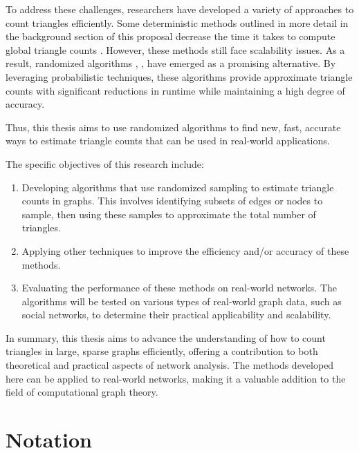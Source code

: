 \documentclass[11pt]{article}
\begin{document}
To address these challenges, researchers have developed a variety of approaches to count triangles efficiently.
Some deterministic methods outlined in more detail in the background section of this proposal decrease the time it takes to compute global triangle counts \cite{strassen_gaussian_1969}.
However, these methods still face scalability issues.
As a result, randomized algorithms \cite{tsourakakis_doulion_2009}, \cite{seshadhri_triadic_2013}, \cite{tsourakakis_fast_2008} have emerged as a promising alternative.
By leveraging probabilistic techniques, these algorithms provide approximate triangle counts with significant reductions in runtime while maintaining a high degree of accuracy.

Thus, this thesis aims to use randomized algorithms to find new, fast, accurate ways to estimate triangle counts that can be used in real-world applications.

The specific objectives of this research include:

\begin{enumerate}
    \item Developing algorithms that use randomized sampling to estimate triangle counts in graphs.
    This involves identifying subsets of edges or nodes to sample, then using these samples to approximate the total number of triangles.
    \item Applying other techniques to improve the efficiency and/or accuracy of these methods.
    \item Evaluating the performance of these methods on real-world networks.
    The algorithms will be tested on various types of real-world graph data, such as social networks, to determine their practical applicability and scalability.
\end{enumerate}

In summary, this thesis aims to advance the understanding of how to count triangles in large, sparse graphs efficiently, offering a contribution to both theoretical and practical aspects of network analysis.
The methods developed here can be applied to real-world networks, making it a valuable addition to the field of computational graph theory.

\section{Notation}
\end{document}
